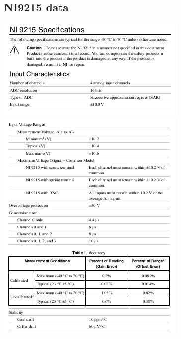 \documentclass[paper=a4, fontsize=11pt, abstract=on]{scrartcl}
\numberwithin{equation}{section}		%
\numberwithin{figure}{section}			%
\numberwithin{table}{section}				%
\begin{document}
\subsection{NI9215 data}
\centering
\includegraphics[width=1.0\linewidth]{a1}
\includegraphics[width=1.0\linewidth]{a2}

\newpage
\end{document}

